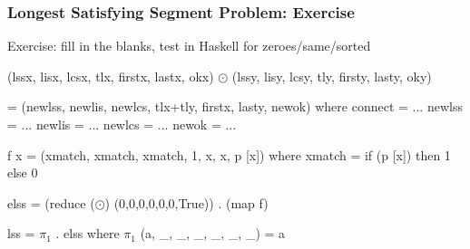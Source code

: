 \documentclass{beamer}
\renewcommand{\emph}[1]{\textcolor{structure}{#1}}
\newcommand{\emp}[1]{\textcolor{DikuRed}{ #1}}
\newcommand{\mymath}[1]{$ #1 $}
\newcommand{\myindx}[1]{_{#1}}
\begin{document}
\begin{frame}[fragile,t]
  \frametitle{Longest Satisfying Segment Problem: Exercise}

\begin{block}{Exercise: fill in the blanks, test in Haskell for zeroes/same/sorted}
\begin{colorcode}
(lssx, lisx, lcsx, tlx, firstx, lastx, okx) \mymath{\odot}
(lssy, lisy, lcsy, tly, firsty, lasty, oky) 

  = (newlss, newlis, newlcs, tlx+tly, firstx, lasty, newok)
     where
        connect = ...
        newlss  = ...
        newlis  = ... 
        newlcs  = ... 
        newok   = ...

f x = (xmatch, xmatch, xmatch, 1, x, x, p [x])
    where xmatch = if (p [x]) then 1 else 0

\emph{elss = (reduce (\mymath{\odot}) (0,0,0,0,0,0,True)) . (map f)}

\emp{lss  = \mymath{\pi\myindx{1}} . elss}
       where \mymath{\pi\myindx{1}} (a, _, _, _, _, _, _) = a         
\end{colorcode}
\end{block} 


\end{frame}



%
%
%
%
%
%
\end{document}
